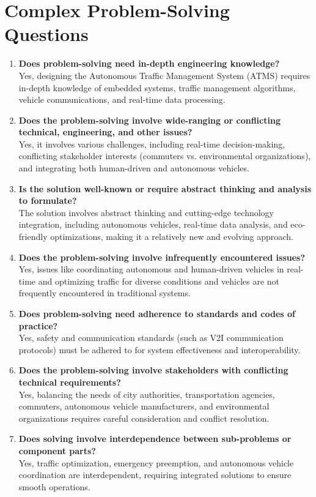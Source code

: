 \documentclass{scrreprt}
\begin{document}
\section*{Complex Problem-Solving Questions}
\begin{enumerate}
    \item \textbf{Does problem-solving need in-depth engineering knowledge?} \\
    Yes, designing the Autonomous Traffic Management System (ATMS) requires in-depth knowledge of embedded systems, traffic management algorithms, vehicle communications, and real-time data processing.
    \item \textbf{Does the problem-solving involve wide-ranging or conflicting technical, engineering, and other issues?} \\
    Yes, it involves various challenges, including real-time decision-making, conflicting stakeholder interests (commuters vs. environmental organizations), and integrating both human-driven and autonomous vehicles.

    \item \textbf{Is the solution well-known or require abstract thinking and analysis to formulate?} \\
    The solution involves abstract thinking and cutting-edge technology integration, including autonomous vehicles, real-time data analysis, and eco-friendly optimizations, making it a relatively new and evolving approach.

    \item \textbf{Does the problem-solving involve infrequently encountered issues?} \\
    Yes, issues like coordinating autonomous and human-driven vehicles in real-time and optimizing traffic for diverse conditions and vehicles are not frequently encountered in traditional systems.

    \item \textbf{Does problem-solving need adherence to standards and codes of practice?} \\
    Yes, safety and communication standards (such as V2I communication protocols) must be adhered to for system effectiveness and interoperability.

    \item \textbf{Does the problem-solving involve stakeholders with conflicting technical requirements?} \\
    Yes, balancing the needs of city authorities, transportation agencies, commuters, autonomous vehicle manufacturers, and environmental organizations requires careful consideration and conflict resolution.

    \item \textbf{Does solving involve interdependence between sub-problems or component parts?} \\
    Yes, traffic optimization, emergency preemption, and autonomous vehicle coordination are interdependent, requiring integrated solutions to ensure smooth operations.
\end{enumerate}
\end{document}
